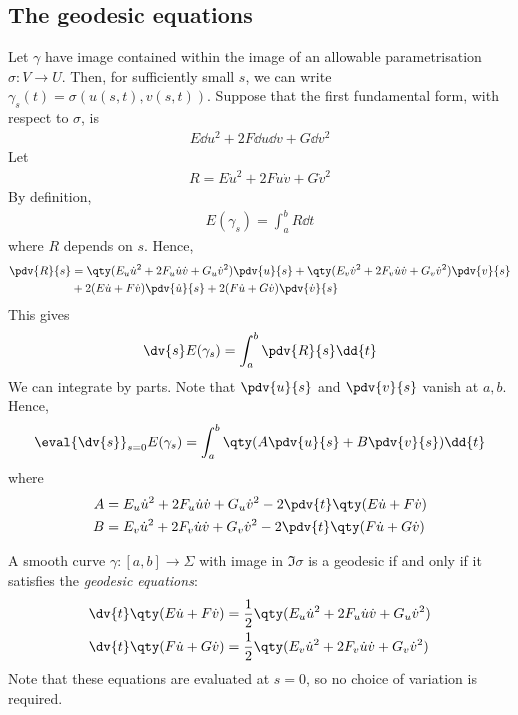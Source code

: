 \subsection{The geodesic equations}
Let $\gamma$ have image contained within the image of an allowable parametrisation $\sigma \colon V \to U$.
Then, for sufficiently small $s$, we can write $\gamma_s(t) = \sigma(u(s,t), v(s,t))$.
Suppose that the first fundamental form, with respect to $\sigma$, is
\begin{align*}
	E \dd{u}^2 + 2F \dd{u} \dd{v} + G \dd{v}^2
\end{align*}
Let
\begin{align*}
	R = E \dot u^2 + 2F \dot u \dot v + G \dot v^2
\end{align*}
By definition,
\begin{align*}
	E(\gamma_s) = \int_a^b R \dd{t}
\end{align*}
where $R$ depends on $s$.
Hence,
\begin{align*}
	\pdv{R}{s} & = \qty(E_u \dot u^2 + 2F_u \dot u \dot v + G_u \dot v^2) \pdv{u}{s} + \qty(E_v \dot v^2 + 2F_v \dot u \dot v + G_v \dot v^2) \pdv{v}{s} \\
	           & + 2 (E \dot u + F \dot v) \pdv{\dot u}{s} + 2(F \dot u + G \dot v) \pdv{\dot v}{s}
\end{align*}
This gives
\begin{align*}
	\dv{s} E(\gamma_s) = \int_a^b \pdv{R}{s} \dd{t}
\end{align*}
We can integrate by parts.
Note that $\pdv{u}{s}$ and $\pdv{v}{s}$ vanish at $a,b$.
Hence,
\begin{align*}
	\eval{\dv{s}}_{s=0} E(\gamma_s) = \int_a^b \qty(A \pdv{u}{s} + B \pdv{v}{s}) \dd{t}
\end{align*}
where
\begin{align*}
	A & = E_u \dot u^2 + 2F_u \dot u \dot v + G_u \dot v^2 - 2 \pdv{t} \qty(E \dot u + F \dot v) \\
	B & = E_v \dot u^2 + 2F_v \dot u \dot v + G_v \dot v^2 - 2 \pdv{t} \qty(F \dot u + G \dot v)
\end{align*}
\begin{corollary}
	A smooth curve $\gamma \colon [a,b] \to \Sigma$ with image in $\Im \sigma$ is a geodesic if and only if it satisfies the \textit{geodesic equations}:
	\begin{align*}
		\dv{t} \qty(E \dot u + F \dot v) & = \frac{1}{2} \qty( E_u \dot u^2 + 2F_u \dot u \dot v + G_u \dot v^2 ) \\
		\dv{t} \qty(F \dot u + G \dot v) & = \frac{1}{2} \qty( E_v \dot u^2 + 2F_v \dot u \dot v + G_v \dot v^2 )
	\end{align*}
	Note that these equations are evaluated at $s = 0$, so no choice of variation is required.
\end{corollary}
